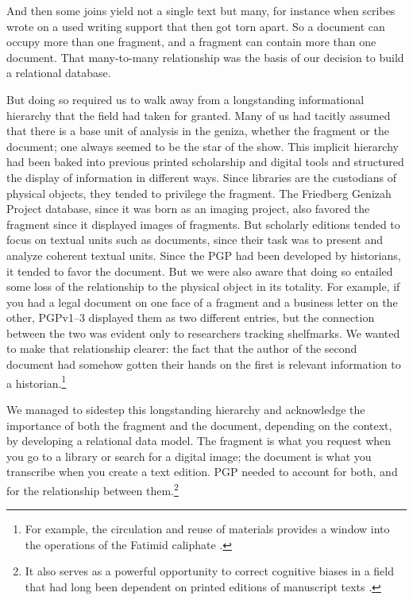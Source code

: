 \documentclass{article}
\begin{document}
And then some joins yield not a single text but many, for instance when scribes wrote on a used writing support that then got torn apart. So a document can occupy more than one fragment, and a fragment can contain more than one document. That many-to-many relationship was the basis of our decision to build a relational database. 

But doing so required us to walk away from a longstanding informational hierarchy that the field had taken for granted. Many of us had tacitly assumed that there is a base unit of analysis in the geniza, whether the fragment or the document; one always seemed to be the star of the show. This implicit hierarchy had been baked into previous printed scholarship and digital tools and structured the display of information in different ways. Since libraries are the custodians of physical objects, they tended to privilege the fragment. The Friedberg Genizah Project database, since it was born as an imaging project, also favored the fragment since it displayed images of fragments. But scholarly editions tended to focus on textual units such as documents, since their task was to present and analyze coherent textual units. Since the PGP had been developed by historians, it  tended to favor the document. But we were also aware that doing so entailed some loss of the relationship to the physical object in its totality. For example, if you had a legal document on one face of a fragment and a business letter on the other, PGPv1–3 displayed them as two different entries, but the connection between the two was evident only to researchers tracking shelfmarks. We wanted to make that relationship clearer: the fact that the author of the second document had somehow gotten their hands on the first is relevant information to a historian.\footnote{For example, the circulation and reuse of materials provides a window into the operations of the Fatimid caliphate \autocite{rustow_lost_2020}.} 

We managed to sidestep this longstanding hierarchy and acknowledge the importance of both the fragment and the document, depending on the context, by developing a relational data model. The fragment is what you request when you go to a library or search for a digital image; the document is what you transcribe when you create a text edition. PGP needed to account for both, and for the relationship between them.\footnote{It also serves as a powerful opportunity to correct cognitive biases in a field that had long been dependent on printed editions of manuscript texts \autocite{rustow_fragmentology_2024}.} 
\end{document}
